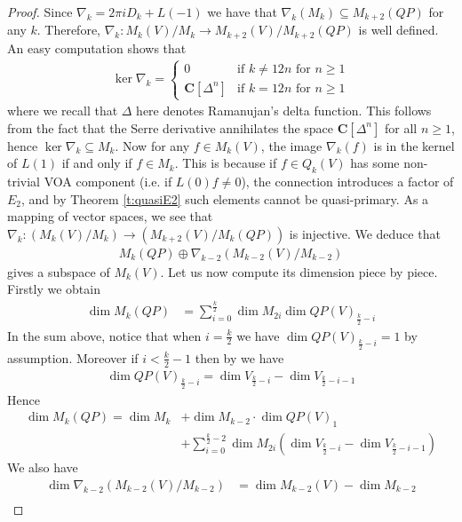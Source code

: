 \documentclass[12pt]{amsart}
\theoremstyle{plain}
\theoremstyle{definition}
\theoremstyle{remark}
\newcommand{\CC}{\mathbf{C}}
\begin{document}
\begin{proof}
Since $\nabla_k = 2\pi i D_k +L(-1)$ we have that $\nabla_k(M_k)\subseteq M_{k+2}(QP)$ for any $k$. Therefore, $\nabla_k\colon M_{k}(V)/M_k\rightarrow M_{k+2}(V)/M_{k+2}(QP)$ is well defined. An easy computation shows that
\begin{align*}
    \ker \nabla_{k} = \begin{cases}
        0 & \text{if $k \neq 12n$ for $n \geq 1$} \\ \CC[ \Delta^{n} ] & \text{if $k = 12n$ for $n \geq 1$}
    \end{cases}
\end{align*}
where we recall that $\Delta$ here denotes Ramanujan's delta function. This follows from the fact that the Serre derivative annihilates the space $\CC [ \Delta^{n} ]$ for all $n \geq 1$, hence $\ker \nabla_{k} \subseteq M_{k}$. Now for any $f \in M_{k}(V)$, the image $\nabla_{k}(f)$ is in the kernel of $L(1)$ if and only if $f \in M_{k}$. This is because if $f \in Q_{k}(V)$ has some non-trivial VOA component (i.e. if $L(0)f \neq 0$), the connection introduces a factor of $E_{2}$, and by Theorem \ref{t:quasiE2} such elements cannot be quasi-primary. As a mapping of vector spaces, we see that $\nabla_{k} : (M_{k}(V) / M_{k}) \to (M_{k+2}(V)/M_k(QP))$ is injective. We deduce that
\begin{align}
    M_k(QP)\oplus \nabla_{k-2}(M_{k-2}(V) / M_{k-2}) \label{connectiondecompeq}
\end{align}
gives a subspace of $M_k(V)$. Let us now compute its dimension piece by piece. Firstly we obtain
\begin{align*}
    \dim M_k(QP)&=\sum_{i=0}^{\frac{k}{2}}\dim M_{2i}\dim QP(V)_{\frac{k}{2}-i}
\end{align*}
In the sum above, notice that when $i=\frac{k}{2}$ we have $\dim QP(V)_{\frac{k}{2}-i}=1$ by assumption. Moreover if $i<\frac{k}{2}-1$ then by \cite[Proposition 3.4 (iii)]{DLMsl2} we have
\begin{align*}
    \dim QP(V)_{\frac{k}{2}-i}=\dim V_{\frac{k}{2}-i}-\dim V_{\frac{k}{2}-i-1}
\end{align*}
Hence
\begin{align*}
    \dim M_k(QP)=\dim M_k&+\dim M_{k-2} \cdot \dim QP(V)_1 \\&+\sum_{i=0}^{\frac{k}{2}-2}\dim M_{2i}(\dim V_{\frac{k}{2}-i}-\dim V_{\frac{k}{2}-i-1})
\end{align*}
We also have
\begin{align*}
    \dim \nabla_{k-2}(M_{k-2}(V) / M_{k-2})&=\dim M_{k-2}(V)-\dim M_{k-2} \\

\end{align*}
\end{proof}
\end{document}
